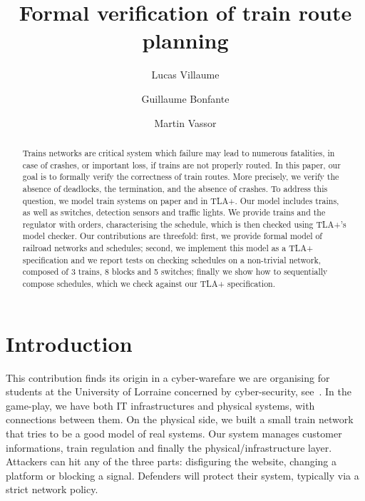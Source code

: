 \documentclass[runningheads]{llncs}
\begin{document}
%
\title{Formal verification of train route planning}
%
%
\author{Lucas Villaume \and Guillaume Bonfante \and Martin Vassor}
%
%
%
\maketitle
%
\begin{abstract}
	Trains networks are critical system which failure may lead to numerous fatalities, in case of crashes, or important loss, if trains are not properly routed. 
	In this paper, our goal is to formally verify the correctness of train routes. More precisely, we verify the absence of deadlocks, the termination, and the absence of crashes.
	To address this question, we model train systems on paper and in TLA+. Our model includes trains, as well as switches, detection sensors and traffic lights. 
	We provide trains and the regulator with orders, characterising the schedule, which is then checked using TLA+'s model checker.
	Our contributions are threefold: first, we provide formal model of railroad networks and schedules; second, we implement this model as a TLA+ specification and we report tests on checking schedules on a non-trivial network, composed of 3 trains, 8 blocks and 5 switches; finally we show how to sequentially compose schedules, which we check against our TLA+ specification.

\end{abstract}


\section{Introduction}
\label{sec:introduction}

This contribution finds its origin in a cyber-warefare we are organising for students at the University of Lorraine concerned by cyber-security, see~\cite{CHE}. In the game-play, we have both IT infrastructures and physical systems, with connections between them. On the physical side, we built a small train network that tries to be a good model of real systems.  Our system manages customer informations, train regulation and finally the physical/infrastructure layer. Attackers can hit any of the three parts: disfiguring the website, changing a platform or blocking a signal. Defenders will protect their system, typically via a strict network policy.
\end{document}

